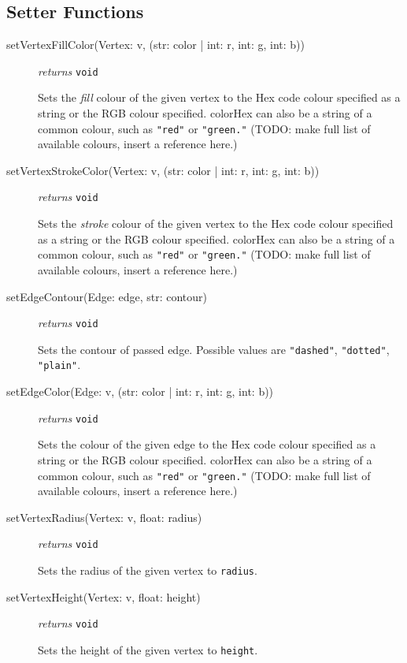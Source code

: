 \documentclass{article}
\begin{document}
\subsection{Setter Functions}
\begin{description}
\item[setVertexFillColor(Vertex: v, (str: color | int: r, int: g, int:
  b))] \emph{returns} \texttt{void}

Sets the \textit{fill} colour of the given vertex to the Hex code colour
specified as a string or the RGB colour specified. colorHex can also be
a string of a common colour, such as \texttt{"red"} or
\texttt{"green."}  (TODO: make full list of available colours, insert
a reference here.)

\item[setVertexStrokeColor(Vertex: v, (str: color | int: r, int: g, int:
  b))] \emph{returns} \texttt{void}

  Sets the \textit{stroke} colour of the given vertex to the Hex code colour
specified as a string or the RGB colour specified. colorHex can also be
a string of a common colour, such as \texttt{"red"} or
\texttt{"green."}  (TODO: make full list of available colours, insert
a reference here.)

\item[setEdgeContour(Edge: edge, str: contour)] \emph{returns}
\texttt{void}

Sets the contour of passed edge. Possible values are
\texttt{"dashed"}, \texttt{"dotted"}, \texttt{"plain"}.

\item[setEdgeColor(Edge: v, (str: color | int: r, int: g, int:
  b))] \emph{returns} \texttt{void}

  Sets the colour of the given edge to the Hex code colour
specified as a string or the RGB colour specified. colorHex can also be
a string of a common colour, such as \texttt{"red"} or
\texttt{"green."}  (TODO: make full list of available colours, insert
a reference here.)

\item[setVertexRadius(Vertex: v, float: radius)] \emph{returns}
  \texttt{void}

Sets the radius of the given vertex to \texttt{radius}.

\item[setVertexHeight(Vertex: v, float: height)] \emph{returns}
  \texttt{void}

Sets the height of the given vertex to \texttt{height}.


\end{description}
\end{document}
